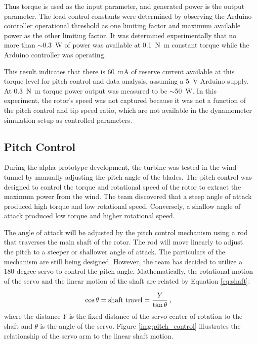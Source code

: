 \documentclass[11pt,letterpaper,conference]{IEEEtran}
\begin{document}
Thus torque is used as the input parameter, and generated power is the
output parameter. The load control constants were determined by observing the
Arduino controller operational threshold as one limiting factor and maximum
available power as the other limiting factor. It was determined experimentally
that no more than $\sim$\qty{0.3}{\W} of power was available at
\qty{.1}{\newton\m} constant torque while the Arduino controller was operating.

This result indicates that there is \qty{60}{\mA} of reserve current available
at this torque level for pitch control and data analysis, assuming a
\qty{5}{\V} Arduino supply. At \qty{.3}{\newton\m} torque power output was
measured to be $\sim$\qty{50}{\W}. In this experiment, the rotor's speed was
not captured because it was not a function of the pitch control and tip speed
ratio, which are not available in the dynamometer simulation setup as controlled
parameters.

\subsection{Pitch Control}

During the alpha prototype development, the turbine was tested in the wind
tunnel by manually adjusting the pitch angle of the blades. The pitch control
was designed to control the torque and rotational speed of the rotor to extract
the maximum power from the wind. The team discovered that a steep angle of
attack produced high torque and low rotational speed. Conversely, a shallow
angle of attack produced low torque and higher rotational speed.

The angle of attack will be adjusted by the pitch control mechanism using a
rod that traverses the main shaft of the rotor. The rod will move linearly to
adjust the pitch to a steeper or shallower angle of attack. The particulars of
the mechanism are still being designed. However, the team has decided to
utilize a 180-degree servo to control the pitch angle. Mathematically, the
rotational motion of the servo and the linear motion of the shaft are related
by Equation \eqref{eq:shaft}:

\begin{equation}
    \label{eq:shaft}
    \cos\theta = \text{shaft travel} = \frac{Y}{\tan\theta}
    \text{\,,}
\end{equation}
where the distance $Y$ is the fixed distance of the servo center of rotation to
the shaft and $\theta$ is the angle of the servo.
Figure \ref{img:pitch_control} illustrates the relationship of the servo arm
to the linear shaft motion.
\end{document}
